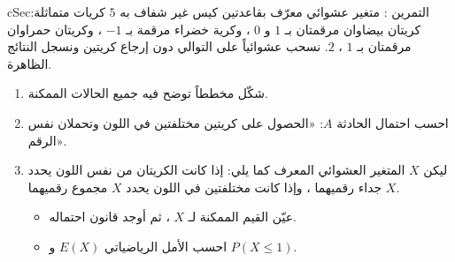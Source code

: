 \documentclass[12pt,a4paper]{article}
\newenvironment{BOX}[2]{\begin{otherlanguage}{english}\begin{arbox}{#1}{#2}}{\end{arbox}\end{otherlanguage}}
\newcounter{exo}
\newenvironment{tamrin}[1]{\stepcounter{exo}\begin{BOX}{cSec}{التمرين \theexo: #1}}{\end{BOX}}
\newenvironment{sq}{\begin{itemize}[leftmargin=2.4em,itemsep=3pt]}{\end{itemize}}
\newcommand{\qa}{\item[(أ)]}\newcommand{\qb}{\item[(ب)]}\newcommand{\qc}{\item[(جـ)]}\newcommand{\qd}{\item[(د)]}\newcommand{\qe}{\item[(هـ)]}
\begin{document}
\begin{tamrin}{متغير عشوائي معرّف بقاعدتين}
كيس غير شفاف به $5$ كريات متماثلة: كريتان بيضاوان مرقمتان بـ $1$ و $0$ ، وكرية خضراء مرقمة بـ $-1$ ، وكريتان حمراوان مرقمتان بـ $1$ ، $2$. نسحب عشوائياً على التوالي دون إرجاع كريتين ونسجل النتائج الظاهرة.
\begin{enumerate}
\item شكّل مخططاً توضح فيه جميع الحالات الممكنة.
\item احسب احتمال الحادثة $A$: «الحصول على كريتين مختلفتين في اللون وتحملان نفس الرقم».
\item ليكن $X$ المتغير العشوائي المعرف كما يلي: إذا كانت الكريتان من نفس اللون يحدد $X$ جداء رقميهما ، وإذا كانت مختلفتين في اللون يحدد $X$ مجموع رقميهما.
\begin{sq}
\qa عيّن القيم الممكنة لـ $X$ ، ثم أوجد قانون احتماله.
\qb احسب الأمل الرياضياتي $E(X)$ و $P(X\le1)$.
\end{sq}
\end{enumerate}
\end{tamrin}
\end{document}
